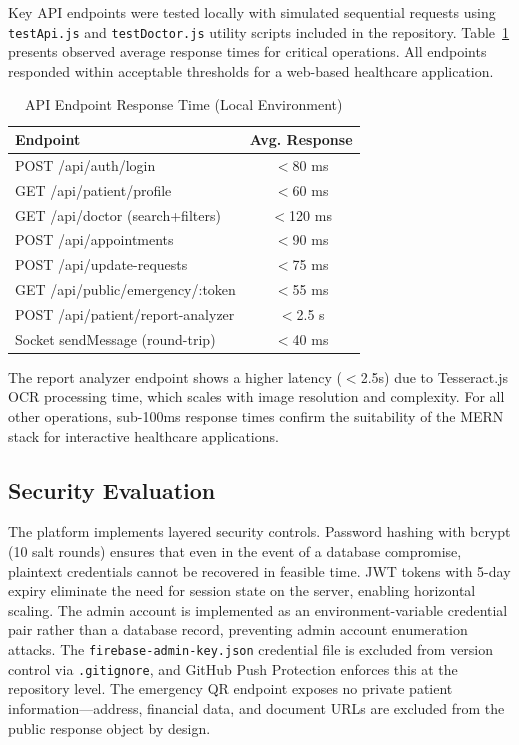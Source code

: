 Key API endpoints were tested locally with simulated sequential requests using \texttt{testApi.js} and \texttt{testDoctor.js} utility scripts included in the repository. Table~\ref{tab:perf} presents observed average response times for critical operations. All endpoints responded within acceptable thresholds for a web-based healthcare application.

\begin{table}[h]
\caption{API Endpoint Response Time (Local Environment)}
\label{tab:perf}
\centering
\renewcommand{\arraystretch}{1.15}
\begin{tabular}{|p{3.8cm}|c|}
\hline
\textbf{Endpoint} & \textbf{Avg. Response} \\
\hline
POST /api/auth/login              & $<$80 ms  \\
GET /api/patient/profile          & $<$60 ms  \\
GET /api/doctor (search+filters)  & $<$120 ms \\
POST /api/appointments            & $<$90 ms  \\
POST /api/update-requests         & $<$75 ms  \\
GET /api/public/emergency/:token  & $<$55 ms  \\
POST /api/patient/report-analyzer & $<$2.5 s  \\
Socket sendMessage (round-trip)   & $<$40 ms  \\
\hline
\end{tabular}
\end{table}

The report analyzer endpoint shows a higher latency ($<$2.5s) due to Tesseract.js OCR processing time, which scales with image resolution and complexity. For all other operations, sub-100ms response times confirm the suitability of the MERN stack for interactive healthcare applications.

\subsection{Security Evaluation}

The platform implements layered security controls. Password hashing with bcrypt (10 salt rounds) ensures that even in the event of a database compromise, plaintext credentials cannot be recovered in feasible time. JWT tokens with 5-day expiry eliminate the need for session state on the server, enabling horizontal scaling. The admin account is implemented as an environment-variable credential pair rather than a database record, preventing admin account enumeration attacks. The \texttt{firebase-admin-key.json} credential file is excluded from version control via \texttt{.gitignore}, and GitHub Push Protection enforces this at the repository level. The emergency QR endpoint exposes no private patient information—address, financial data, and document URLs are excluded from the public response object by design.

